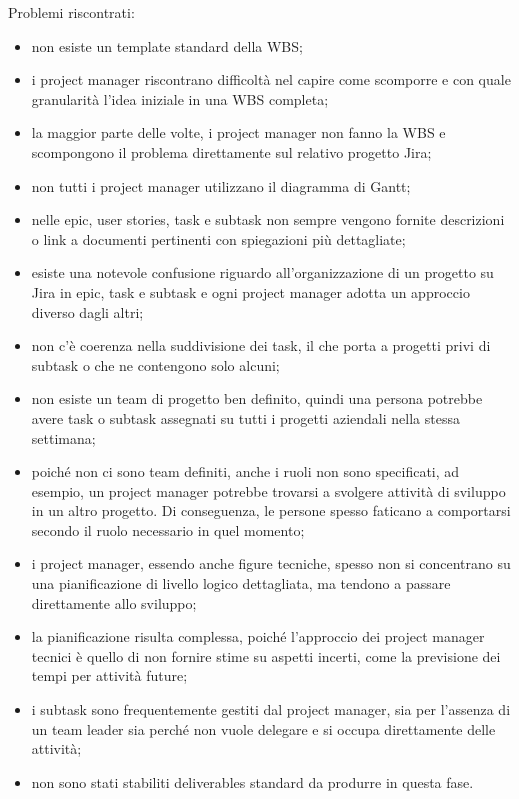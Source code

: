         Problemi riscontrati:
        \begin{itemize}
            \item non esiste un template standard della \ac{WBS};
            \item i project manager riscontrano difficoltà nel capire come scomporre e con quale granularità l’idea iniziale in una \ac{WBS} completa;
            \item la maggior parte delle volte, i project manager non fanno la \ac{WBS} e scompongono il problema direttamente sul relativo progetto Jira;
            \item non tutti i project manager utilizzano il diagramma di Gantt;
            \item nelle epic, user stories, task e subtask non sempre vengono fornite descrizioni o link a documenti pertinenti con spiegazioni più dettagliate;
            \item esiste una notevole confusione riguardo all'organizzazione di un progetto su Jira in epic, task e subtask e
            ogni project manager adotta un approccio diverso dagli altri;
            \item non c'è coerenza nella suddivisione dei task, il che porta a progetti privi di subtask o che ne contengono solo alcuni;
            \item non esiste un team di progetto ben definito, quindi una persona potrebbe avere task o subtask assegnati su tutti i progetti aziendali nella stessa settimana;
            \item poiché non ci sono team definiti, anche i ruoli non sono specificati, ad esempio, un project manager potrebbe trovarsi a svolgere attività di sviluppo in un altro progetto.
            Di conseguenza, le persone spesso faticano a comportarsi secondo il ruolo necessario in quel momento;
            \item i project manager, essendo anche figure tecniche, spesso non si concentrano su una pianificazione di livello logico
            dettagliata, ma tendono a passare direttamente allo sviluppo;
            \item la pianificazione risulta complessa, poiché l’approccio dei project manager tecnici è quello di non fornire stime su aspetti incerti, come la previsione
            dei tempi per attività future;
            \item i subtask sono frequentemente gestiti dal project manager, sia per l'assenza di un team leader sia perché non vuole
            delegare e si occupa direttamente delle attività;
            \item non sono stati stabiliti deliverables standard da produrre in questa fase.
        \end{itemize}


